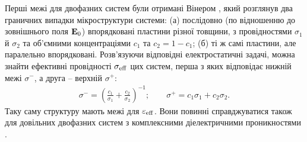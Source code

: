 \documentclass[14pt,twoside]{vakthesis}
\begin{document}
Перші межі для двофазних систем були отримані Вінером \cite{Wiener1912}, який розглянув два граничних випадки  мікроструктури системи: 
(а) послідовно (по відношенню до зовнішнього поля ${\bf E}_0$) впорядковані пластини різної товщини, з провідностями $\sigma_1$ й $\sigma_2$ та об'ємними концентраціями $c_1$ та $c_2=1-c_1$; (б) ті ж самі пластини, але паралельно впорядковані. 
Розв'язуючи відповідні електростатичні задачі, можна знайти  ефективні провідності $\sigma_{\rm eff}$ цих систем, перша з яких відповідає нижній межі $\sigma^{-}$, а друга -- верхній $\sigma^{+}$:
\begin{equation}\label{eq:wiener-bounds}
\begin{split}
\sigma^{-} = \left( \frac{c_1}{\sigma_1} + \frac{c_2}{\sigma_2} \right)^{-1};\qquad
\sigma^{+} = c_1 \sigma_1 + c_2 \sigma_2.
\end{split}
\end{equation}
Таку  саму структуру мають межі для   $\varepsilon_{\rm eff}$.
Вони повинні справджуватися також для довільних двофазних систем з комплексними діелектричними проникностями \cite{Aspnes1982}.
\end{document}
